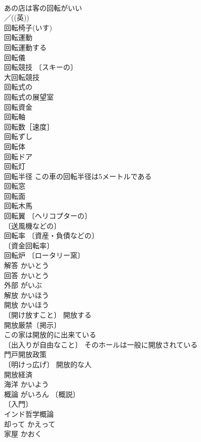 \documentclass[8pt]{extreport}
\begin{document}
\begin{CJK}{UTF8}{min}
\\	あの店は客の回転がいい 
\\	／((英)) 
\\	回転椅子(いす) 
\\	回転運動 
\\	回転運動する 
\\	回転儀 
\\	回転競技 〔スキーの〕
\\	大回転競技 
\\	回転式の 
\\	回転式の展望室 
\\	回転資金 
\\	回転軸 
\\	回転数［速度］ 
\\	回転ずし 
\\	回転体 
\\	回転ドア 
\\	回転灯 
\\	回転半径 この車の回転半径は5メートルである 
\\	回転窓 
\\	回転面 
\\	回転木馬 
\\	回転翼 〔ヘリコプターの〕
\\	〔送風機などの〕
\\	回転率 〔資産・負債などの〕
\\	〔資金回転率〕
\\	回転炉 〔ロータリー窯〕
\\	解答	かいとう	
\\	回答	かいとう	
\\	外部	がいぶ	
\\	解放	かいほう	
\\	開放	かいほう	
\\	〔開け放すこと〕 開放する 
\\	開放厳禁〔掲示〕 
\\	この家は開放的に出来ている 
\\	〔出入りが自由なこと〕 そのホールは一般に開放されている 
\\	門戸開放政策 
\\	〔明けっ広げ〕 開放的な人 
\\	開放経済 
\\	海洋	かいよう	
\\	概論	がいろん	〔概説〕
\\	〔入門〕
\\	インド哲学概論 
\\	却って	かえって	
\\	家屋	かおく	

\end{CJK}
\end{document}
